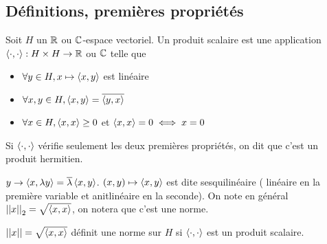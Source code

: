 \subsection{Définitions, premières propriétés}

\begin{definition}
	Soit $H$ un $\mathbb{R}$ ou $\mathbb{C}$-espace vectoriel.
	Un produit scalaire est une application $\left\langle \cdot, \cdot \right\rangle : H \times H \to \mathbb{R}$ ou $\mathbb{C}$ telle que
	\begin{itemize}
		\item $\forall y \in H, x \mapsto \left\langle x, y \right\rangle$ est linéaire
		\item $\forall x,y \in H, \left\langle x, y \right\rangle = \overline{\left\langle y, x \right\rangle}$
		\item $\forall x \in H, \left\langle x, x \right\rangle \geq 0$ et $\left\langle x, x \right\rangle = 0 \iff x = 0$
	\end{itemize}

	Si $\left\langle \cdot, \cdot \right\rangle$ vérifie seulement les deux premières propriétés, on dit que c'est un produit hermitien.
\end{definition}

\begin{remarque}
	$ y \to \left\langle x, \lambda y \right\rangle = \overline{\lambda} \left\langle x, y \right\rangle $.
	$(x,y) \mapsto \left\langle x, y \right\rangle$ est dite sesquilinéaire ( linéaire en la première variable et anitlinéaire en la seconde).
	On note en général $\left|\left|x\right|\right|_2 = \sqrt{\left\langle x, x \right\rangle}$, on notera que c'est une norme.
\end{remarque}


\begin{coro}
	$\left|\left|x\right|\right| = \sqrt{\left\langle x, x \right\rangle}$ définit une norme sur $H$ si $\left\langle \cdot, \cdot \right\rangle$ est un produit scalaire.
\end{coro}

